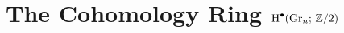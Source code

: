 \documentclass[../main]{subfiles}
\begin{document}
\chapter{The Cohomology Ring \texorpdfstring{$\operatorname{H}^\bullet(\operatorname{Gr}_n;\,\mathbb Z/2)$}{H*(Gr n; Z/2}}\label{ch:7}



\end{document}
